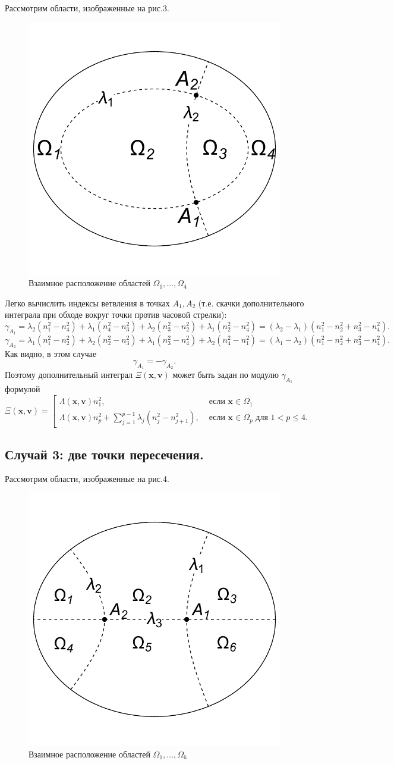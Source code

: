 Рассмотрим области, изображенные на рис.3. 
\begin{figure}[ht]
\begin{minipage}{\linewidth}\centering
        \includegraphics[width=0.35\linewidth]{images/ch3/img3.pdf}  
    \end{minipage}
\caption{Взаимное расположение областей $\Omega_1,\ldots,\Omega_4$}
\end{figure}


Легко вычислить индексы ветвления в точках $A_1, A_2$ (т.е. скачки дополнительного интеграла при обходе вокруг точки против часовой стрелки):
$$\gamma_{A_1} = \lambda_2(n_1^2 - n_4^2) + \lambda_1(n_4^2-n_3^2) + \lambda_2(n_3^2-n_2^2) + \lambda_1(n_2^2-n_4^2) = (\lambda_2 - \lambda_1) ( n_1^2 - n_2^2 + n_3^2 - n_4^2).$$
$$\gamma_{A_2} = \lambda_1(n_1^2 - n_2^2) + \lambda_2(n_2^2-n_3^2) + \lambda_1(n_3^2-n_4^2) + \lambda_2(n_4^2-n_1^2) = (\lambda_1 - \lambda_2) ( n_1^2 - n_2^2 + n_3^2 - n_4^2).$$
Как видно, в этом случае $$\gamma_{A_1} = -\gamma_{A_2}.$$
Поэтому дополнительный интеграл $\Xi(\mathbf{x}, \mathbf{v})$ может быть задан по модулю $\gamma_{A_1}$ формулой
\begin{equation*}
\Xi(\mathbf{x}, \mathbf{v}) = \left[
\begin{array}{ll}
    \Lambda(\mathbf{x}, \mathbf{v}) n_1^2, &  \text{ если } \mathbf{x} \in \Omega_1 
    \\
    \Lambda(\mathbf{x}, \mathbf{v}) n_p^2 + 
    \sum_{j=1}^{p-1} \lambda_j(n_j^2-n_{j+1}^2), & \text{ если } \mathbf{x} \in \Omega_p \text{ для } 1 < p \leq 4. 
\end{array}
\right.
\end{equation*}

\subsection{ Случай 3: две точки пересечения.}
Рассмотрим области, изображенные на рис.4. 

\begin{figure}[ht]
\begin{minipage}{\linewidth}\centering
        \includegraphics[width=0.25\linewidth]{images/ch3/img4.pdf}  
    \end{minipage}
\caption{Взаимное расположение областей $\Omega_1,\ldots,\Omega_6$}
\end{figure}

